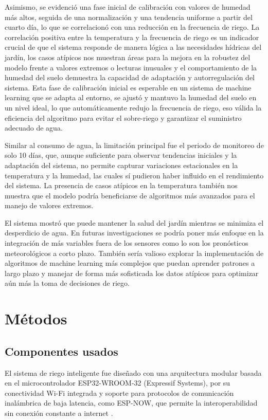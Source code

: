 \documentclass[pdflatex,sn-mathphys-num]{sn-jnl}%
\theoremstyle{thmstyleone}%
\theoremstyle{thmstyletwo}%
\theoremstyle{thmstylethree}%
\begin{document}
\begin{multicols}{2}
Asimismo, se evidenció una fase inicial de calibración con valores de humedad más altos, seguida de una normalización y una tendencia uniforme a partir del cuarto día, lo que se correlacionó con una reducción en la frecuencia de riego. La correlación positiva entre la temperatura y la frecuencia de riego es un indicador crucial de que el sistema responde de manera lógica a las necesidades hídricas del jardín, los casos atípicos nos muestran áreas para la mejora en la robustez del modelo frente a valores extremos o lecturas inusuales y el comportamiento de la humedad del suelo demuestra la capacidad de adaptación y autorregulación del sistema. Esta fase de calibración inicial es esperable en un sistema de machine learning que se adapta al entorno, se ajustó y mantuvo la humedad del suelo en un nivel ideal, lo que automáticamente redujo la frecuencia de riego, eso válida la eficiencia del algoritmo para evitar el sobre-riego y garantizar el suministro adecuado de agua.

Similar al consumo de agua, la limitación principal fue el periodo de monitoreo de solo 10 días, que, aunque suficiente para observar tendencias iniciales y la adaptación del sistema, no permite capturar variaciones estacionales en la temperatura y la humedad, las cuales sí pudieron haber influido en el rendimiento del sistema. La presencia de casos atípicos en la temperatura también nos muestra que el modelo podría beneficiarse de algoritmos más avanzados para el manejo de valores extremos.

El sistema mostró que puede mantener la salud del jardín mientras se minimiza el desperdicio de agua. En futuras investigaciones se podría poner más enfoque en la integración de más variables fuera de los sensores como lo son los pronósticos meteorológicos a corto plazo. También sería valioso explorar la implementación de algoritmos de machine learning más complejos que puedan aprender patrones a largo plazo y manejar de forma más sofisticada los datos atípicos para optimizar aún más la toma de decisiones de riego.
\section*{Métodos}

\subsection*{Componentes usados}

El sistema de riego inteligente fue diseñado con una arquitectura modular basada en el microcontrolador ESP32-WROOM-32 (Expressif Systems), por su conectividad Wi-Fi integrada y soporte para protocolos de comunicación inalámbrica de baja latencia, como ESP-NOW, que permite la interoperabilidad sin conexión constante a internet \cite{ref15}. 


\end{multicols}
\end{document}
